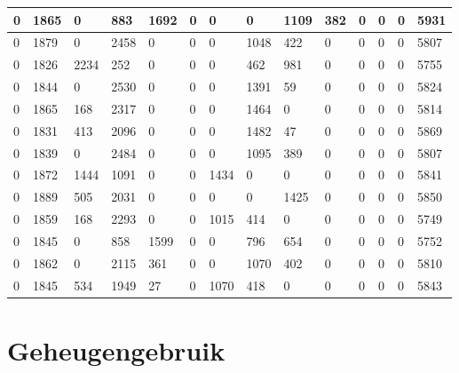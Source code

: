 \begin{longtable}{ | l | l | l | l | l | l | l | l | l | l | l | l | l | |l | }
	0 & 1865 & 0 & 883 & 1692 & 0 & 0 & 0 & 1109 & 382 & 0 & 0 & 0 & 5931 \\ \hline
	0 & 1879 & 0 & 2458 & 0 & 0 & 0 & 1048 & 422 & 0 & 0 & 0 & 0 & 5807 \\ \hline
	0 & 1826 & 2234 & 252 & 0 & 0 & 0 & 462 & 981 & 0 & 0 & 0 & 0 & 5755 \\ \hline
	0 & 1844 & 0 & 2530 & 0 & 0 & 0 & 1391 & 59 & 0 & 0 & 0 & 0 & 5824 \\ \hline
	0 & 1865 & 168 & 2317 & 0 & 0 & 0 & 1464 & 0 & 0 & 0 & 0 & 0 & 5814 \\ \hline
	0 & 1831 & 413 & 2096 & 0 & 0 & 0 & 1482 & 47 & 0 & 0 & 0 & 0 & 5869 \\ \hline
	0 & 1839 & 0 & 2484 & 0 & 0 & 0 & 1095 & 389 & 0 & 0 & 0 & 0 & 5807 \\ \hline
	0 & 1872 & 1444 & 1091 & 0 & 0 & 1434 & 0 & 0 & 0 & 0 & 0 & 0 & 5841 \\ \hline
	0 & 1889 & 505 & 2031 & 0 & 0 & 0 & 0 & 1425 & 0 & 0 & 0 & 0 & 5850 \\ \hline
	0 & 1859 & 168 & 2293 & 0 & 0 & 1015 & 414 & 0 & 0 & 0 & 0 & 0 & 5749 \\ \hline
	0 & 1845 & 0 & 858 & 1599 & 0 & 0 & 796 & 654 & 0 & 0 & 0 & 0 & 5752 \\ \hline
	0 & 1862 & 0 & 2115 & 361 & 0 & 0 & 1070 & 402 & 0 & 0 & 0 & 0 & 5810 \\ \hline
	0 & 1845 & 534 & 1949 & 27 & 0 & 1070 & 418 & 0 & 0 & 0 & 0 & 0 & 5843 \\ \hline
\end{longtable}


\section{ Geheugengebruik}
\label{dataset:geheugengebruik}

